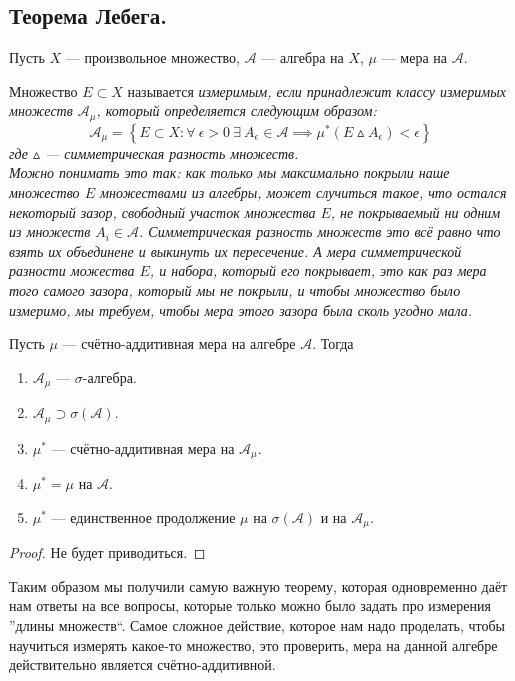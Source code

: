 \subsection{Теорема Лебега.}
Пусть $X$ --- произвольное множество, $\mathcal{A}$ --- алгебра на $X$, $\mu$ --- мера на $\mathcal{A}$.
\begin{definition}
    Множество $E \subset X$ называется \it{измеримым}, если принадлежит \it{классу измеримых множеств} $\mathcal{A}_{\mu}$,
    который определяется следующим образом:
    \[
        \mathcal{A}_{\mu} = \left\{ E \subset X \colon \forall~\epsilon > 0 ~\exists~A_{\epsilon} \in \mathcal{A}
        \implies \mu^*(E \vartriangle A_{\epsilon}) < \epsilon \right\}
    \]
    где $\vartriangle$ --- симметрическая разность множеств.\\
    Можно понимать это так: как только мы максимально покрыли наше множество $E$ множествами из алгебры, может случиться
    такое, что остался некоторый зазор, свободный участок множества $E$, не покрываемый ни одним из множеств $A_i \in \mathcal{A}$.
    Симметрическая разность множеств это всё равно что взять их объединене и выкинуть их пересечение. А мера симметрической разности
    можества $E$, и набора, который его покрывает, это как раз мера того самого зазора, который мы не покрыли, и чтобы множество
    было измеримо, мы требуем, чтобы мера этого зазора была сколь угодно мала.
\end{definition}
\begin{theorem}[Лебега]
    Пусть $\mu$ --- счётно-аддитивная мера на алгебре $\mathcal{A}$. Тогда
    \begin{enumerate}
        \item $\mathcal{A}_{\mu}$ --- $\sigma$-алгебра.
        \item $\mathcal{A}_{\mu} \supset \sigma(\mathcal{A})$.
        \item $\mu^*$ --- счётно-аддитивная мера на $\mathcal{A}_{\mu}$.
        \item $\mu^* = \mu$ на $\mathcal{A}$.
        \item $\mu^*$ --- единственное продолжение $\mu$ на $\sigma(\mathcal{A})$ и на $\mathcal{A}_{\mu}$.
    \end{enumerate}
\end{theorem}
\begin{proof}
    Не будет приводиться.
\end{proof}
Таким образом мы получили самую важную теорему, которая одновременно даёт нам ответы на все вопросы, которые только можно
было задать про измерения ''длины множеств``. Самое сложное действие, которое нам надо проделать, чтобы научиться измерять
какое-то множество, это проверить, мера на данной алгебре действительно является счётно-аддитивной.
